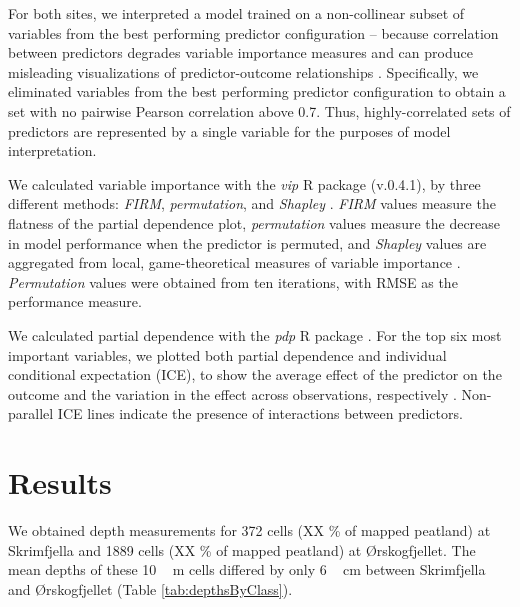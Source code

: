 \documentclass[soil, manuscript]{copernicus}
\begin{document}
For both sites, we interpreted a model trained on a non-collinear subset of variables from the best performing predictor configuration -- because correlation between predictors degrades variable importance measures \citep{stroblConditionalVariableImportance2008, biauRandomForestGuided2016} and can produce misleading visualizations of predictor-outcome relationships \citep{biecekExplanatoryModelAnalysis2021, dwivediExplainableAIXAI2023}.
Specifically, we eliminated variables from the best performing predictor configuration to obtain a set with no pairwise Pearson correlation above 0.7.
Thus, highly-correlated sets of predictors are represented by a single variable for the purposes of model interpretation.

We calculated variable importance with the \emph{vip} R package (v.0.4.1), by three different methods: \emph{FIRM}, \emph{permutation}, and \emph{Shapley} \citep{greenwellVariableImportancePlots2020}.
\emph{FIRM} values measure the flatness of the partial dependence plot, \emph{permutation} values measure the decrease in model performance when the predictor is permuted, and \emph{Shapley} values are aggregated from local, game-theoretical measures of variable importance \citep{greenwellVariableImportancePlots2020}.
\emph{Permutation} values were obtained from ten iterations, with RMSE as the performance measure.

We calculated partial dependence with the \emph{pdp} R package \citep[v.0.8.1,][]{greenwellPdpPackageConstructing2017}.
For the top six most important variables, we plotted both partial dependence and individual conditional expectation (ICE), to show the average effect of the predictor on the outcome and the variation in the effect across observations, respectively \citep{goldsteinPeekingBlackBox2015}.
Non-parallel ICE lines indicate the presence of interactions between predictors.

\section{Results}

We obtained depth measurements for 372 cells (XX \% of mapped peatland) at Skrimfjella and 1889 cells (XX \% of mapped peatland) at Ørskogfjellet.
The mean depths of these \unit{10\,m} cells differed by only \unit{6\,cm} between Skrimfjella and Ørskogfjellet (Table \ref{tab:depthsByClass}).
\end{document}
